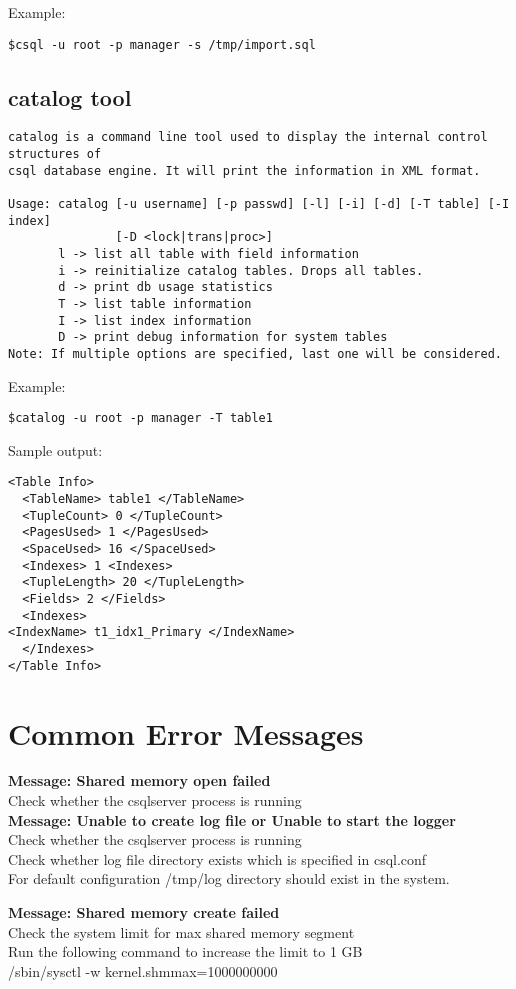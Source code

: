 \documentclass[12pt]{article}
\begin{document}
Example: 
\begin{verbatim}
$csql -u root -p manager -s /tmp/import.sql
\end{verbatim}

\subsection{catalog tool}
\label{catalogtool}
\begin{verbatim}
catalog is a command line tool used to display the internal control structures of 
csql database engine. It will print the information in XML format.

Usage: catalog [-u username] [-p passwd] [-l] [-i] [-d] [-T table] [-I index] 
               [-D <lock|trans|proc>]
       l -> list all table with field information
       i -> reinitialize catalog tables. Drops all tables.
       d -> print db usage statistics
       T -> list table information
       I -> list index information
       D -> print debug information for system tables
Note: If multiple options are specified, last one will be considered.
\end{verbatim}

Example: 
\begin{verbatim}
$catalog -u root -p manager -T table1
\end{verbatim}
Sample output:
\begin{verbatim}
<Table Info> 
  <TableName> table1 </TableName>
  <TupleCount> 0 </TupleCount>
  <PagesUsed> 1 </PagesUsed>
  <SpaceUsed> 16 </SpaceUsed>
  <Indexes> 1 <Indexes>
  <TupleLength> 20 </TupleLength>
  <Fields> 2 </Fields>
  <Indexes>
<IndexName> t1_idx1_Primary </IndexName>
  </Indexes>
</Table Info> 
\end{verbatim}

\section{Common Error Messages}
\label{errormessages}
\textbf {Message: Shared memory open failed}  \\
Check whether the csqlserver process is running \\

\textbf {Message: Unable to create log file or Unable to start the logger}\\
Check whether the csqlserver process is running \\
Check whether log file directory exists which is specified in csql.conf \\
For default configuration /tmp/log directory should exist in the system.

\textbf {Message: Shared memory create failed}\\
Check the system limit for max shared memory segment \\
Run the following command to increase the limit to 1 GB \\
/sbin/sysctl -w kernel.shmmax=1000000000 

\end{document}
